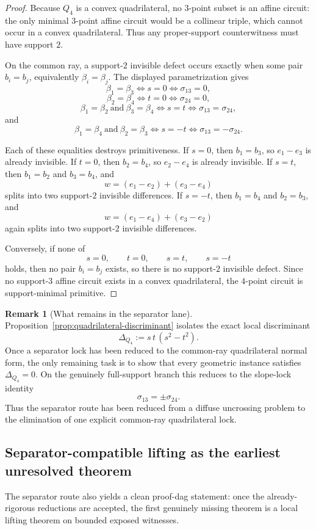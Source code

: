 \documentclass[11pt]{article}
\theoremstyle{definition}
\newtheorem{remark}[theorem]{Remark}
\newcommand{\1}{\mathbf{1}}
\begin{document}
\begin{proof}
Because $Q_4$ is a convex quadrilateral, no $3$-point subset is an affine circuit: the only minimal $3$-point affine circuit would be a collinear triple, which cannot occur in a convex quadrilateral. Thus any proper-support counterwitness must have support $2$.

On the common ray, a support-$2$ invisible defect occurs exactly when some pair $b_i=b_j$, equivalently $\beta_i=\beta_j$. The displayed parametrization gives
\[
\beta_1=\beta_3 \iff s=0 \iff \sigma_{13}=0,
\]
\[
\beta_2=\beta_4 \iff t=0 \iff \sigma_{24}=0,
\]
\[
\beta_1=\beta_2 \ \text{and}\ \beta_3=\beta_4
\iff s=t \iff \sigma_{13}=\sigma_{24},
\]
and
\[
\beta_1=\beta_4 \ \text{and}\ \beta_2=\beta_3
\iff s=-t \iff \sigma_{13}=-\sigma_{24}.
\]

Each of these equalities destroys primitiveness. If $s=0$, then $b_1=b_3$, so $e_1-e_3$ is already invisible. If $t=0$, then $b_2=b_4$, so $e_2-e_4$ is already invisible. If $s=t$, then $b_1=b_2$ and $b_3=b_4$, and
\[
w=(e_1-e_2)+(e_3-e_4)
\]
splits into two support-$2$ invisible differences. If $s=-t$, then $b_1=b_4$ and $b_2=b_3$, and
\[
w=(e_1-e_4)+(e_3-e_2)
\]
again splits into two support-$2$ invisible differences.

Conversely, if none of
\[
s=0,\qquad t=0,\qquad s=t,\qquad s=-t
\]
holds, then no pair $b_i=b_j$ exists, so there is no support-$2$ invisible defect. Since no support-$3$ affine circuit exists in a convex quadrilateral, the $4$-point circuit is support-minimal primitive.
\end{proof}

\begin{remark}[What remains in the separator lane]\label{rem:quadrilateral-what-remains}
Proposition~\ref{prop:quadrilateral-discriminant} isolates the exact local discriminant
\[
\Delta_{Q_4}:=s\,t\,(s^2-t^2).
\]
Once a separator lock has been reduced to the common-ray quadrilateral normal form, the only remaining task is to show that every geometric instance satisfies $\Delta_{Q_4}=0$. On the genuinely full-support branch this reduces to the slope-lock identity
\[
\sigma_{13}=\pm \sigma_{24}.
\]
Thus the separator route has been reduced from a diffuse uncrossing problem to the elimination of one explicit common-ray quadrilateral lock.
\end{remark}

\subsection*{Separator-compatible lifting as the earliest unresolved theorem}
The separator route also yields a clean proof-dag statement: once the already-rigorous reductions are accepted, the first genuinely missing theorem is a local lifting theorem on bounded exposed witnesses.
\end{document}
